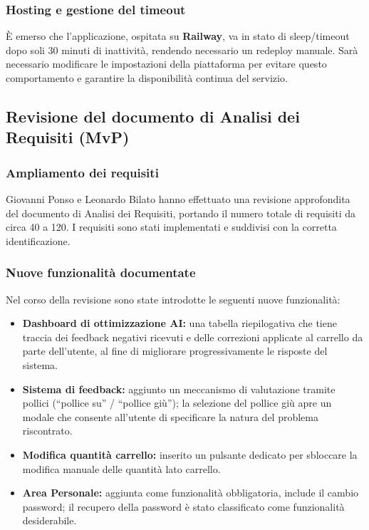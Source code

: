 \documentclass[a4paper, 11pt, oneside]{scrartcl}
\begin{document}
\subsubsection{Hosting e gestione del timeout}
È emerso che l'applicazione, ospitata su \textbf{Railway}, va in stato di sleep/timeout dopo soli 30 minuti di inattività, rendendo necessario un redeploy manuale. Sarà necessario modificare le impostazioni della piattaforma per evitare questo comportamento e garantire la disponibilità continua del servizio.

\subsection{Revisione del documento di Analisi dei Requisiti (MvP)}
\subsubsection{Ampliamento dei requisiti}
Giovanni Ponso e Leonardo Bilato hanno effettuato una revisione approfondita del documento di Analisi dei Requisiti, portando il numero totale di requisiti da circa 40 a 120. I requisiti sono stati implementati e suddivisi con la corretta identificazione.

\subsubsection{Nuove funzionalità documentate}
Nel corso della revisione sono state introdotte le seguenti nuove funzionalità:
\begin{itemize}
    \item \textbf{Dashboard di ottimizzazione AI:} una tabella riepilogativa che tiene traccia dei feedback negativi ricevuti e delle correzioni applicate al carrello da parte dell'utente, al fine di migliorare progressivamente le risposte del sistema.
    \item \textbf{Sistema di feedback:} aggiunto un meccanismo di valutazione tramite pollici (``pollice su'' / ``pollice giù''); la selezione del pollice giù apre un modale che consente all'utente di specificare la natura del problema riscontrato.
    \item \textbf{Modifica quantità carrello:} inserito un pulsante dedicato per sbloccare la modifica manuale delle quantità lato carrello.
    \item \textbf{Area Personale:} aggiunta come funzionalità obbligatoria, include il cambio password; il recupero della password è stato classificato come funzionalità desiderabile.
\end{itemize}
\end{document}
